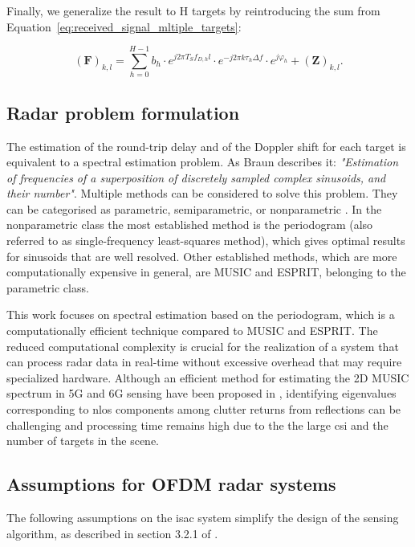     Finally, we generalize the result to H targets by reintroducing the sum from Equation~\eqref{eq:received_signal_mltiple_targets}:
    
    \begin{equation*}
        (\mathbf F)_{k,l} =  \sum_{h=0}^{H-1} b_h \cdot e^{j2\pi T_S f_{D,h} l}\cdot e^{-j2\pi k \tau_h \Delta f} \cdot e^{j\varphi_h} + (\mathbf{Z})_{k,l}.
    \end{equation*}
    
    \subsection{Radar problem formulation}
    
    The estimation of the round-trip delay and of the Doppler shift for each target is equivalent to a spectral estimation problem. As Braun describes it: \textit{"Estimation of frequencies of a superposition of discretely sampled complex sinusoids, and their number"}.
    Multiple methods can be considered to solve this problem. They can be categorised as parametric, semiparametric, or nonparametric \cite{Stoica_New_Method_Parameter_Estimation}. 
    In the nonparametric class the most established method is the periodogram (also referred to as single-frequency least-squares method), which gives optimal results for sinusoids that are well resolved.
    Other established methods, which are more computationally expensive in general, are MUSIC and ESPRIT, belonging to the parametric class.
    
    This work focuses on spectral estimation based on the periodogram, which is a computationally efficient technique compared to MUSIC and ESPRIT.
    The reduced computational complexity is crucial for the realization of a system that can process radar data in real-time without excessive overhead that may require specialized hardware.
    Although an efficient method for estimating the 2D MUSIC spectrum in 5G and 6G sensing have been proposed in \cite{Henninger_Mandelli_Arnold_EfficientMUSIC}, identifying eigenvalues corresponding to \gls{nlos} components among clutter returns from reflections can be challenging and processing time remains high due to the the large \gls{csi} and the number of targets in the scene.
    
    
    \subsection{Assumptions for OFDM radar systems}
    \label{sub:assumptions_ofdm_radar}
    The following assumptions on the \gls{isac} system simplify the design of the sensing algorithm, as described in section 3.2.1 of \cite{Braun2014OFDMRA}.
    
